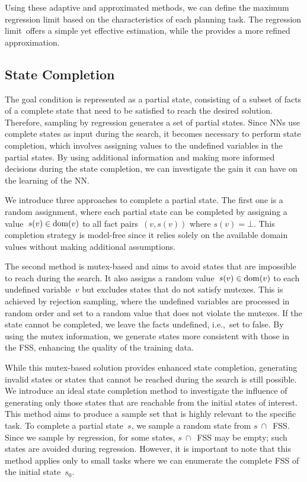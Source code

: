 Using these adaptive and approximated methods, we can define the maximum regression limit based on the characteristics of each planning task. The regression limit~\facts offers a simple yet effective estimation, while the \meanfx provides a more refined approximation.

\subsection{State Completion}
\label{sec:state-completion}

The goal condition is represented as a partial state, consisting of a subset of facts of a complete state that need to be satisfied to reach the desired solution. Therefore, sampling by regression generates a set of partial states. Since NNs use complete states as input during the search, it becomes necessary to perform state completion, which involves assigning values to the undefined variables in the partial states. By using additional information and making more informed decisions during the state completion, we can investigate the gain it can have on the learning of the NN.

We introduce three approaches to complete a partial state. The first one is a random assignment, where each partial state can be completed by assigning a value~$s(v) \in \operatorname{dom}(v)$ to all fact pairs~$(v,s(v))$ where $s(v)=\bot$. This completion strategy is model-free since it relies solely on the available domain values without making additional assumptions.

The second method is mutex-based and aims to avoid states that are impossible to reach during the search. It also assigns a random value~$s(v) \in \operatorname{dom}(v)$ to each undefined variable~$v$ but excludes states that do not satisfy mutexes. This is achieved by rejection sampling, where the undefined variables are processed in random order and set to a random value that does not violate the mutexes. If the state cannot be completed, we leave the facts undefined, i.e.,~set to false. By using the mutex information, we generate states more consistent with those in the FSS, enhancing the quality of the training data.

While this mutex-based solution provides enhanced state completion, generating invalid states or states that cannot be reached during the search is still possible. We introduce an ideal state completion method to investigate the influence of generating only those states that are reachable from the initial states of interest. This method aims to produce a sample set that is highly relevant to the specific task. To complete a partial state~$s$, we sample a random state from $s~\cap$~FSS. Since we sample by regression, for some states, $s~\cap$~FSS may be empty; such states are avoided during regression. However, it is important to note that this method applies only to small tasks where we can enumerate the complete FSS of the initial state~$s_0$.

